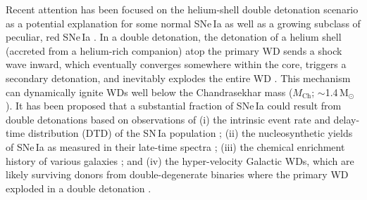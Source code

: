 \documentclass[twocolumn]{aastex631}
\newcommand{\Mch}{$M_\mathrm{Ch}$}
\newcommand{\chang}[1]{\textcolor{blue}{[Chang: #1]}}
\begin{document}
\begin{CJK*}{UTF8}{gbsn}
Recent attention has been focused on the helium-shell double detonation scenario as a potential explanation for some normal SNe\,Ia \citep[e.g.,][]{polin_observational_2019,Shen_2D_2021} as well as a growing subclass of peculiar, red SNe\,Ia \citep[e.g.,][]{jiang_16jhr_2017, de_18byg_2019,Liu_20jgb_2023}. In a double detonation, the detonation of a helium shell (accreted from a helium-rich companion) atop the primary WD sends a shock wave inward, %
which eventually converges somewhere within the core, triggers a secondary detonation, and inevitably explodes the entire WD \citep{Nomoto_1982a,Nomoto_1982b,Woosley_1986,Livne_1990,Woosley_1994,Livne_1995}. This mechanism can dynamically ignite WDs well below the Chandrasekhar mass (\Mch; $\sim$1.4\,$\mathrm{M_\odot}$). It has been proposed that a substantial fraction of SNe\,Ia could result from double detonations based on observations of (i) the intrinsic event rate and delay-time distribution (DTD) of the SN\,Ia population \citep{Ruiter_2011,Ruiter_2014}; (ii) the nucleosynthetic yields of SNe\,Ia as measured in their late-time spectra \citep{Maguire_2018,Flors_2020}; (iii) the chemical enrichment history of various galaxies \citep{Kirby_2019,de_los_reyes_manganese_2020,Sanders_2021,Eitner_2022}; and (iv) the hyper-velocity Galactic WDs, which are likely surviving donors from double-degenerate binaries where the primary WD exploded in a double detonation \citep{Shen_2018,El-Badry_2023}.


\end{CJK*}
\end{document}
